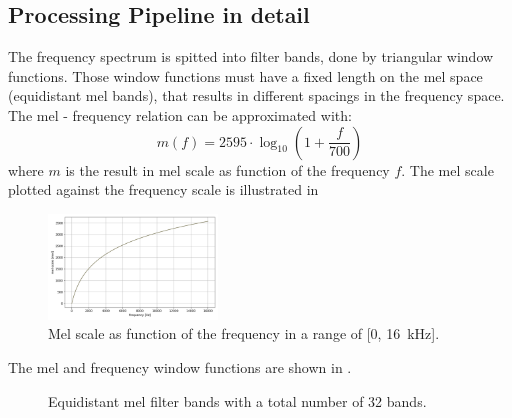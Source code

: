 \subsection{Processing Pipeline in detail}
The frequency spectrum is spitted into filter bands, done by triangular window functions.
Those window functions must have a fixed length on the mel space (equidistant mel bands), that results in different spacings in
the frequency space.
The mel - frequency relation can be approximated with:
\begin{equation}\label{eq:signal_mfcc_mel}
  m(f) = 2595 \cdot \log_{10} \left(1 + \frac{f}{700} \right) 
\end{equation}
where $m$ is the result in mel scale as function of the frequency $f$.
The mel scale plotted against the frequency scale is illustrated in 
\begin{figure}[!ht]
  \centering
  \includegraphics[width=0.40\textwidth]{./3_signal/figs/signal_mfcc_mel_scale}
  \caption{Mel scale as function of the frequency in a range of [0, \SI{16}{\kilo\hertz}].}
  \label{fig:signal_mfcc_mel_scale}
\end{figure}
\FloatBarrier
\noindent


The mel and frequency window functions are shown in .
\begin{figure}[!ht]
  \centering
  \quad
  \caption{Equidistant mel filter bands with a total number of 32 bands.}
  \label{fig:filter_bands}
\end{figure}
\FloatBarrier
\noindent

